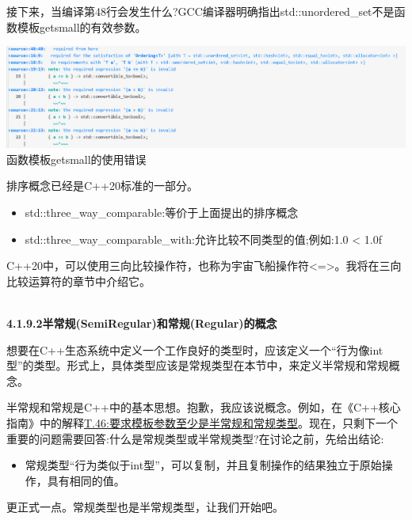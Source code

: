 接下来，当编译第48行会发生什么?GCC编译器明确指出std::unordered\_set不是函数模板getsmall的有效参数。

\begin{center}
\includegraphics[width=1.0\textwidth]{content/3/chapter4/images/1-5.png}\\
函数模板getsmall的使用错误
\end{center}

排序概念已经是C++20标准的一部分。

\begin{itemize}
\item
std::three\_way\_comparable:等价于上面提出的排序概念

\item
std::three\_way\_comparable\_with:允许比较不同类型的值;例如:1.0 < 1.0f
\end{itemize}

C++20中，可以使用三向比较操作符，也称为宇宙飞船操作符<=>。我将在三向比较运算符的章节中介绍它。

\hspace*{\fill} \\ %
\noindent
\textbf{4.1.9.2\hspace{0.2cm}半常规(SemiRegular)和常规(Regular)的概念}

想要在C++生态系统中定义一个工作良好的类型时，应该定义一个“行为像int型”的类型。形式上，具体类型应该是常规类型在本节中，来定义半常规和常规概念。

半常规和常规是C++中的基本思想。抱歉，我应该说概念。例如，在《C++核心指南》中的解释\href{http://isocpp.github.io/CppCoreGuidelines/CppCoreGuidelines#Rt-regular}{T.46:要求模板参数至少是半常规和常规类型}。现在，只剩下一个重要的问题需要回答:什么是常规类型或半常规类型?在讨论之前，先给出结论:

\begin{itemize}
\item
常规类型“行为类似于int型”，可以复制，并且复制操作的结果独立于原始操作，具有相同的值。
\end{itemize}

更正式一点。常规类型也是半常规类型，让我们开始吧。


